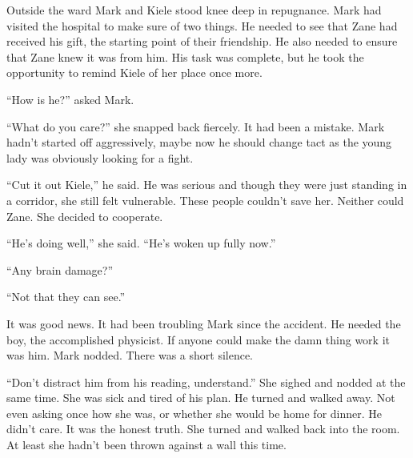 \thoughtbreak



Outside the ward Mark and Kiele stood knee deep in repugnance.  Mark had visited the hospital to make sure of two things.  He needed to see that Zane had received his gift, the starting point of their friendship.  He also needed to ensure that Zane knew it was from him.  His task was complete, but he took the opportunity to remind Kiele of her place once more.

``How is he?'' asked Mark.  

``What do you care?'' she snapped back fiercely.  It had been a mistake.  Mark hadn't started off aggressively, maybe now he should change tact as the young lady was obviously looking for a fight.

``Cut it out Kiele,'' he said.  He was serious and though they were just standing in a corridor, she still felt vulnerable.  These people couldn't save her.  Neither could Zane.  She decided to cooperate.

``He's doing well,'' she said.  ``He's woken up fully now.''

``Any brain damage?''

``Not that they can see.''

It was good news.  It had been troubling Mark since the accident.  He needed the boy, the accomplished physicist.  If anyone could make the damn thing work it was him.  Mark nodded.  There was a short silence.

``Don't distract him from his reading, understand.''  She sighed and nodded at the same time.  She was sick and tired of his plan.  He turned and walked away.  Not even asking once how she was, or whether she would be home for dinner.  He didn't care.  It was the honest truth.  She turned and walked back into the room.  At least she hadn't been thrown against a wall this time.

